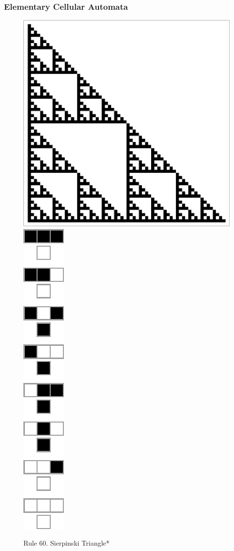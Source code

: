 \documentclass{beamer}
\begin{document}
\begin{frame}
    \frametitle{Elementary Cellular Automata}
    \begin{figure}
        \includegraphics[scale=0.5]{seir.pdf}
        \includegraphics[scale=0.7]{rule60.pdf}
        \caption{Rule 60. Sierpinski Triangle*}
    \end{figure}
\end{frame}
\end{document}
